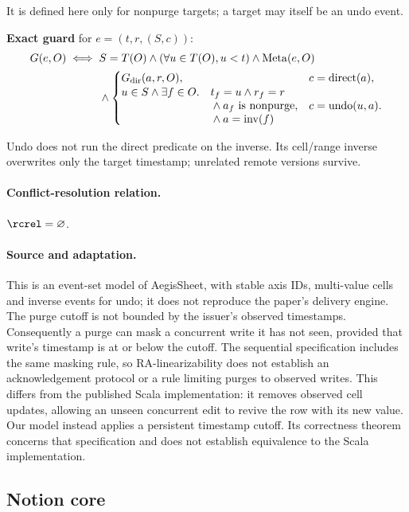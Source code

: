 It is defined here only for nonpurge targets; a target may itself be an undo event.

\textbf{Exact guard} for $e=(t,r,(S,c))$:
\[
\begin{aligned}G(e,O)\iff\;&S=T(O)\land(\forall u\in T(O),u<t)\land\operatorname{Meta}(e,O)\\&\land\begin{cases}G_{\rm dir}(a,r,O),&c=\mathrm{direct}(a),\\\begin{aligned}u\in S\land\exists f\in O.\quad&t_f=u\land r_f=r\\&\land a_f\text{ is nonpurge}\\&\land a=\operatorname{inv}(f)\end{aligned},&c=\mathrm{undo}(u,a).\end{cases}\end{aligned}
\]

Undo does not run the direct predicate on the inverse. Its cell/range inverse overwrites only the target timestamp; unrelated remote versions survive.


\paragraph{Conflict-resolution relation.}
$\rcrel=\varnothing$.


\paragraph{Source and adaptation.}
This is an event-set model of AegisSheet, with stable axis IDs, multi-value
cells and inverse events for undo; it does not reproduce the paper's delivery
engine. The purge cutoff is not bounded by the issuer's observed timestamps.
Consequently a purge can mask a concurrent write it has not seen, provided
that write's timestamp is at or below the cutoff. The sequential specification
includes the same masking rule, so RA-linearizability does not establish an
acknowledgement protocol or a rule limiting purges to observed writes.
This differs from the published Scala implementation: it removes observed
cell updates, allowing an unseen concurrent edit to revive the row with its
new value. Our model instead applies a persistent timestamp cutoff. Its
correctness theorem concerns that specification and does not establish
equivalence to the Scala implementation.


\subsection{Notion core}
\label{app:dt-notion-core}

